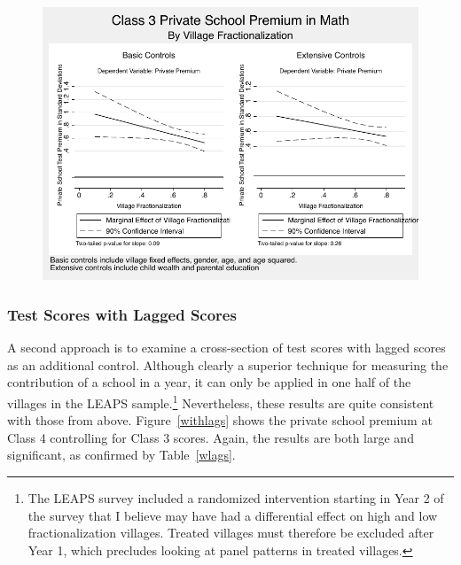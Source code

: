 \documentclass[12pt]{article}
\begin{document}
\begin{figure}[htb]
	\includegraphics[scale=0.8]{graphs/privatepremium_math_crosssection.pdf}
\end{figure}



\subsubsection{Test Scores with Lagged Scores}\label{} 
A second approach is to examine a cross-section of test scores with lagged scores as an additional control. Although clearly a superior technique for measuring the contribution of a school in a year, it can only be applied in one half of the villages in the LEAPS sample.\footnote{The LEAPS survey included a randomized intervention starting in Year 2 of the survey that I believe may have had a differential effect on high and low fractionalization villages. Treated villages must therefore be excluded after Year 1, which precludes looking at panel patterns in treated villages.} Nevertheless, these results are quite consistent with those from above. Figure~\ref{withlags} shows the private school premium at Class 4 controlling for Class 3 scores. Again, the results are both large and significant, as confirmed by Table~\ref{wlags}.
\end{document}
